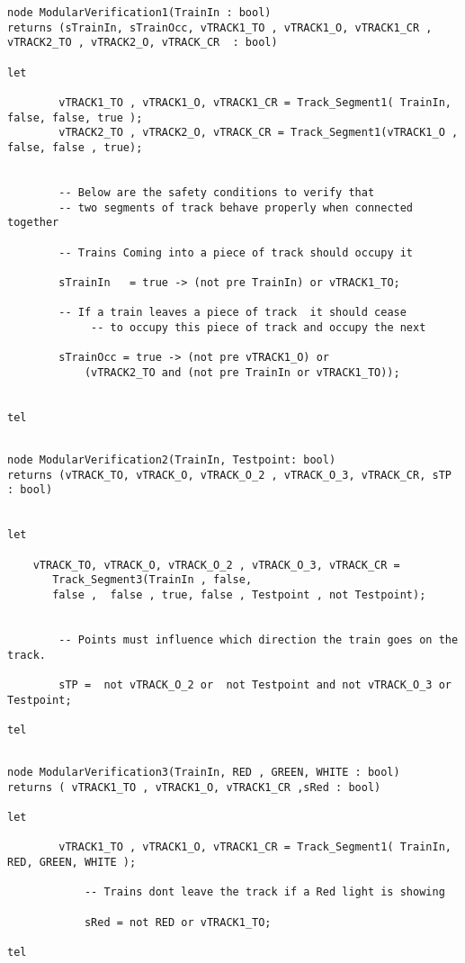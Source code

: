 \begin{verbatim}
node ModularVerification1(TrainIn : bool)
returns (sTrainIn, sTrainOcc, vTRACK1_TO , vTRACK1_O, vTRACK1_CR ,
vTRACK2_TO , vTRACK2_O, vTRACK_CR  : bool)

let		

		vTRACK1_TO , vTRACK1_O, vTRACK1_CR = Track_Segment1( TrainIn, false, false, true );  
		vTRACK2_TO , vTRACK2_O, vTRACK_CR = Track_Segment1(vTRACK1_O , false, false , true);


		-- Below are the safety conditions to verify that 
		-- two segments of track behave properly when connected together

		-- Trains Coming into a piece of track should occupy it
		
		sTrainIn   = true -> (not pre TrainIn) or vTRACK1_TO;

		-- If a train leaves a piece of track  it should cease
             -- to occupy this piece of track and occupy the next
		
		sTrainOcc = true -> (not pre vTRACK1_O) or 
            (vTRACK2_TO and (not pre TrainIn or vTRACK1_TO));
			
		
tel

\end{verbatim}


\begin{verbatim}

node ModularVerification2(TrainIn, Testpoint: bool)
returns (vTRACK_TO, vTRACK_O, vTRACK_O_2 , vTRACK_O_3, vTRACK_CR, sTP : bool)


let

	vTRACK_TO, vTRACK_O, vTRACK_O_2 , vTRACK_O_3, vTRACK_CR =
       Track_Segment3(TrainIn , false,
       false ,  false , true, false , Testpoint , not Testpoint);

		
		-- Points must influence which direction the train goes on the track.
		
		sTP =  not vTRACK_O_2 or  not Testpoint and not vTRACK_O_3 or Testpoint;

tel

\end{verbatim}

\begin{verbatim}

node ModularVerification3(TrainIn, RED , GREEN, WHITE : bool)
returns ( vTRACK1_TO , vTRACK1_O, vTRACK1_CR ,sRed : bool)

let

		vTRACK1_TO , vTRACK1_O, vTRACK1_CR = Track_Segment1( TrainIn, RED, GREEN, WHITE );  

			-- Trains dont leave the track if a Red light is showing
			
			sRed = not RED or vTRACK1_TO;

tel

\end{verbatim}

